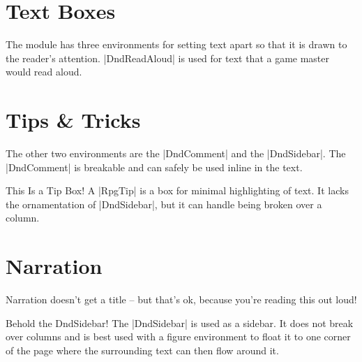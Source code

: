 	\section{Text Boxes}

	The module has three environments for setting text apart so that it is drawn to the reader's attention. |DndReadAloud| is used for text that a game master would read aloud.
	\section{Tips \& Tricks}
	The other two environments are the |DndComment| and the |DndSidebar|. The |DndComment| is breakable and can safely be used inline in the text.

	\begin{RpgTip}{This Is a Tip Box!}
	A |RpgTip| is a box for minimal highlighting of text. It lacks the ornamentation of |DndSidebar|, but it can handle being broken over a column.
	\end{RpgTip}



	\section{Narration}

	\begin{RpgNarration}
		Narration doesn't get a title -- but that's ok, because you're reading this out loud!
	\end{RpgNarration}

	\begin{RpgSidebar}[]{Behold the DndSidebar!}
  The |DndSidebar| is used as a sidebar. It does not break over columns and is best used with a figure environment to float it to one corner of the page where the surrounding text can then flow around it.
\end{RpgSidebar}
